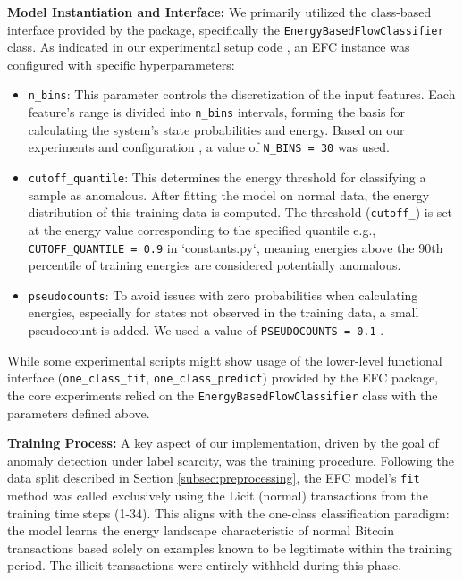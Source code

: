 \documentclass[12pt]{article}
\begin{document}
\textbf{Model Instantiation and Interface:} We primarily utilized the class-based interface provided by the package,
specifically the \texttt{EnergyBasedFlowClassifier} class. As indicated in our experimental setup code \cite{reproducibility},
an EFC instance was configured with specific hyperparameters:

\begin{itemize}
    \item \texttt{n\_bins}: This parameter controls the discretization of the input features. Each feature's range is
      divided into \texttt{n\_bins} intervals, forming the basis for calculating the system's state probabilities and
      energy. Based on our experiments and configuration \cite{reproducibility}, a value of \texttt{N\_BINS = 30} was used.
    \item \texttt{cutoff\_quantile}: This determines the energy threshold for classifying a sample as anomalous. After
      fitting the model on normal data, the energy distribution of this training data is computed. The threshold
      (\texttt{cutoff\_}) is set at the energy value corresponding to the specified quantile
      e.g., \texttt{CUTOFF\_QUANTILE = 0.9} in `constants.py`, meaning energies above the 90th percentile of training
      energies are considered potentially anomalous.
    \item \texttt{pseudocounts}: To avoid issues with zero probabilities when calculating energies, especially for states 
      not observed in the training data, a small pseudocount is added. We used a value of \texttt{PSEUDOCOUNTS = 0.1}
      \cite{reproducibility}.
\end{itemize}

While some experimental scripts might show usage of the lower-level functional interface
(\texttt{one\_class\_fit}, \texttt{one\_class\_predict}) provided by the EFC package, the core experiments relied on the
\texttt{EnergyBasedFlowClassifier} class with the parameters defined above.

\textbf{Training Process:} A key aspect of our implementation, driven by the goal of anomaly detection under label scarcity,
was the training procedure. Following the data split described in Section \ref{subsec:preprocessing}, the EFC model's
\texttt{fit} method was called exclusively using the Licit (normal) transactions from the training time steps (1-34).
This aligns with the one-class classification paradigm: the model learns the energy landscape characteristic of normal
Bitcoin transactions based solely on examples known to be legitimate within the training period. The illicit transactions
were entirely withheld during this phase.
\end{document}
